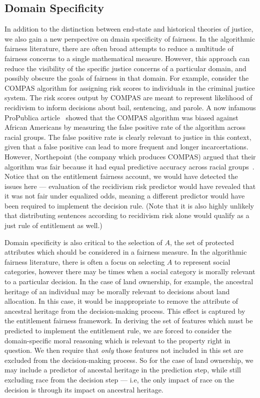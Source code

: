 \subsection{Domain Specificity}

In addition to the distinction between end-state and historical theories of
justice, we also gain a new perspective on dmain specificity of fairness. In
the algorithmic fairness literature, there are often broad attempts to reduce a
multitude of fairness concerns to a single mathematical measure. However, this
approach can reduce the visibility of the specific justice concerns of a
particular domain, and possibly obscure the goals of fairness in that domain.
For example, consider the COMPAS algorithm for assigning risk scores to 
individuals in the criminal justice system. The risk scores output by COMPAS 
are meant to represent likelihood of recidivism to inform decisions about
bail, sentencing, and parole. A now infamous ProPublica
article~\cite{Angwin_2016} showed that the COMPAS algorithm was biased against
African Americans by measuring the false positive rate of the algorithm across
racial groups. The false positive rate is clearly relevant to justice in this 
context, given that a false positive can lead to more frequent and longer 
incarcertations. However, Northepoint (the company which produces COMPAS)
argued that their algorithm was fair because it had equal predictive accuracy
across racial groups~\cite{Flores_2016}. Notice that on the entitlement fairness
account, we would have detected the issues here — evaluation of the recidivism
risk predictor would have revealed that it was not fair under equalized odds,
meaning a different predictor would have been required to implement the decision
rule. (Note that it is also highly unlikely that distributing sentences
according to recidivism risk alone would qualify as a just rule of entitlement
as well.)

Domain specificity is also critical to the selection of $A$, the set of 
protected attributes which should be considered in a fairness measure. In the
algorithmic fairness literature, there is often a focus on selecting $A$ to
represent social categories, however there may be times when a social category
is morally relevant to a particular decision. In the case of land ownership, for
example, the ancestral heritage of an individual may be morally relevant to 
decisions about land allocation. In this case, it would be inappropriate to
remove the attribute of ancestral heritage from the decision-making process.
This effect is captured by the entitlement fairness framework. In deriving the
set of features which must be predicted to implement the entitlement rule, we
are forced to consider the domain-specific moral reasoning which is relevant to
the property right in question. We then require that \emph{only} those features
not included in this set are excluded from the decision-making process. So for
the case of land ownership, we may include a predictor of ancestal heritage in 
the prediction step, while still excluding race from the decision step — i.e,
the only impact of race on the decision is through its impact on ancestral
heritage.


